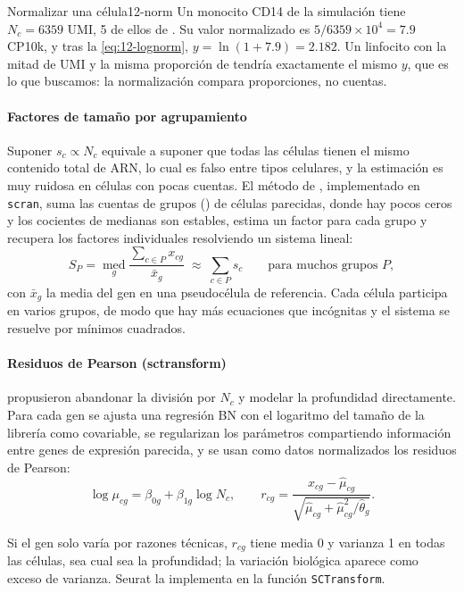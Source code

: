 \begin{ejemplo}{Normalizar una célula}{12-norm}
Un monocito CD14 de la simulación tiene $N_c=\num{6359}$ UMI, 5 de ellos de . Su valor normalizado es $5/\num{6359}\times10^4=\num{7.9}$ CP10k, y tras la \cref{eq:12-lognorm}, $y=\ln(1+\num{7.9})=\num{2.182}$. Un linfocito con la mitad de UMI y la misma proporción de  tendría exactamente el mismo $y$, que es lo que buscamos: la normalización compara proporciones, no cuentas.
\end{ejemplo}

\paragraph{Factores de tamaño por agrupamiento} Suponer $s_c\propto N_c$ equivale a suponer que todas las células tienen el mismo contenido total de ARN, lo cual es falso entre tipos celulares, y la estimación es muy ruidosa en células con pocas cuentas. El método de \textcite{c12-lun2016}, implementado en \texttt{scran}, suma las cuentas de grupos () de células parecidas, donde hay pocos ceros y los cocientes de medianas son estables, estima un factor para cada grupo y recupera los factores individuales resolviendo un sistema lineal:
\begin{equation}\label{eq:12-pool}
\hat{S}_P = \operatorname*{med}_g \frac{\sum_{c\in P} x_{cg}}{\bar{x}_g}\;\approx\;\sum_{c\in P} s_c\qquad\text{para muchos grupos }P,
\end{equation}
con $\bar{x}_g$ la media del gen en una pseudocélula de referencia. Cada célula participa en varios grupos, de modo que hay más ecuaciones que incógnitas y el sistema se resuelve por mínimos cuadrados.

\paragraph{Residuos de Pearson (sctransform)} \textcite{c12-hafemeister2019} propusieron abandonar la división por $N_c$ y modelar la profundidad directamente. Para cada gen se ajusta una regresión BN con el logaritmo del tamaño de la librería como covariable, se regularizan los parámetros compartiendo información entre genes de expresión parecida, y se usan como datos normalizados los residuos de Pearson:
\begin{equation}\label{eq:12-pearson}
\log\mu_{cg} = \beta_{0g} + \beta_{1g}\log N_c,\qquad
r_{cg} = \frac{x_{cg}-\hat\mu_{cg}}{\sqrt{\hat\mu_{cg}+\hat\mu_{cg}^2/\hat\theta_g}}.
\end{equation}
\begin{simbolos}
\end{simbolos}
Si el gen solo varía por razones técnicas, $r_{cg}$ tiene media 0 y varianza 1 en todas las células, sea cual sea la profundidad; la variación biológica aparece como exceso de varianza. Seurat la implementa en la función \texttt{SCTransform}.

